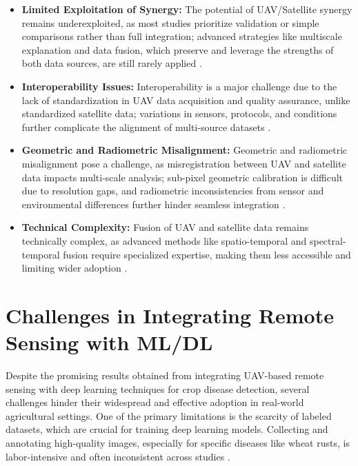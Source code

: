 \begin{itemize}
    \item \textbf{Limited Exploitation of Synergy:} The potential of UAV/Satellite synergy remains underexploited, as most studies prioritize validation or simple comparisons rather than full integration; advanced strategies like multiscale explanation and data fusion, which preserve and leverage the strengths of both data sources, are still rarely applied \parencite{AlvarezVanhard2021}.
  
    \item \textbf{Interoperability Issues:} Interoperability is a major challenge due to the lack of standardization in UAV data acquisition and quality assurance, unlike standardized satellite data; variations in sensors, protocols, and conditions further complicate the alignment of multi-source datasets \parencite{AlvarezVanhard2021}.
  
    \item \textbf{Geometric and Radiometric Misalignment:} Geometric and radiometric misalignment pose a challenge, as misregistration between UAV and satellite data impacts multi-scale analysis; sub-pixel geometric calibration is difficult due to resolution gaps, and radiometric inconsistencies from sensor and environmental differences further hinder seamless integration \parencite{AlvarezVanhard2021}.
  
    \item \textbf{Technical Complexity:} Fusion of UAV and satellite data remains technically complex, as advanced methods like spatio-temporal and spectral-temporal fusion require specialized expertise, making them less accessible and limiting wider adoption \parencite{AlvarezVanhard2021}.
  \end{itemize}
  

\section{Challenges in Integrating Remote Sensing with ML/DL}
Despite the promising results obtained from integrating UAV-based remote sensing with deep learning techniques for crop disease detection, several challenges hinder their widespread and effective adoption in real-world agricultural settings. One of the primary limitations is the scarcity of labeled datasets, which are crucial for training deep learning models. Collecting and annotating high-quality images, especially for specific diseases like wheat rusts, is labor-intensive and often inconsistent across studies \parencite{shahi2023recent}.

